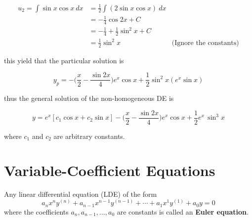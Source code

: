 \begin{solution}
    \begin{align*}
        u_2 = \int \sin x \cos x \> dx &= \frac{1}{2} \int (2 \sin x \cos x) \> dx\\
        &= -\frac{1}{4} \cos 2x + C \\
        &= -\frac{1}{4} + \frac{1}{2} \sin^2 x + C\\
        &= \frac{1}{2} \sin^2 x & \text{(Ignore the constants)}
    \end{align*}

    this yield that the particular solution is 

    \[
        y_p = - \biggl(\frac{x}{2} - \frac{\sin 2x}{4} \biggr) e^x \cos x 
        + \frac{1}{2} \sin^2 x (e^x \sin x)
    \]

    thus the general solution of the non-homogeneous DE is
    
    \[
        y = e^x[c_1 \cos x + c_2 \sin x] - \biggl(\frac{x}{2} - \frac{\sin 2x}{4} \biggr) e^x \cos x 
        + \frac{1}{2} e^x \, \sin^3 x
    \]

    where $c_1$ and $c_2$ are arbitrary constants.
\end{solution}

\section{Variable-Coefficient Equations}

\begin{definition}
    Any linear differential equation (LDE) of the form
    \begin{equation}
        a_n x^n y^{(n)} + a_{n-1} x^{n-1} y^{(n-1)} + \cdots +
    a_{1} x^{1} y^{(1)} + a_{0} y = 0
    \end{equation}
    where the coefficients $a_n, a_{n-1}, \ldots, a_0$ are constants is called an \textbf{Euler equation}.
\end{definition}

